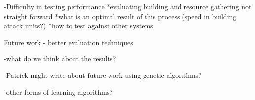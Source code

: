 -Difficulty in testing performance
 *evaluating building and resource gathering not straight forward
 *what is an optimal result of this process (speed in building attack units?)
 *how to test against other systems

 Future work - better evaluation techniques

-what do we think about the results?

-Patrick might write about future work using genetic algorithms?

-other forms of learning algorithms?